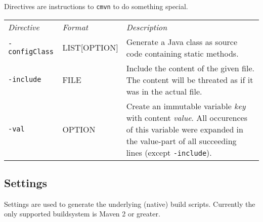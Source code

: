 \documentclass[a4paper,12pt,english,oneside,halfparskip]{scrartcl}
\newcommand{\cmvn}{\texttt{cmvn}}
\newcommand{\code}[1]{\texttt{#1}}
\begin{document}
Directives are instructions to \cmvn{} to do something special.

\begin{tabular}{llp{}}
\emph{Directive} & \emph{Format} & \emph{Description} \\
\code{-configClass} & LIST[OPTION] & Generate a Java class as source code containing static methods. \\
\code{-include} & FILE & Include the content of the given file. The content will be threated as if it was in the actual file. \\
\code{-val} & OPTION & Create an immutable variable \emph{key} with content \emph{value}. All occurences of this variable were expanded in the value-part of all succeeding lines (except \code{-include}). \\
\end{tabular}


\subsection{Settings}

Settings are used to generate the underlying (native) build scripts. Currently the only supported buildsystem is Maven 2 or greater.
\end{document}
